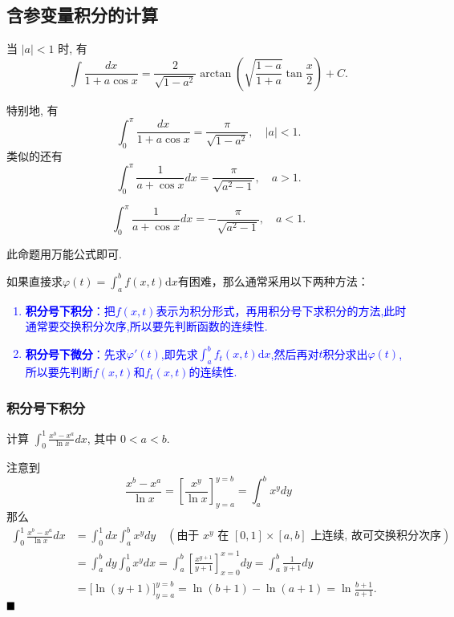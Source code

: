 \documentclass[lang=cn,newtx,10pt,scheme=chinese]{elegantbook}
\begin{document}
\subsection{含参变量积分的计算}
\begin{proposition}
当 $|a|<1$ 时, 有
\begin{equation*}
\int \frac{dx}{1+a\cos x} = \frac{2}{\sqrt{1-a^2}} \arctan\left(\sqrt{\frac{1-a}{1+a}}\tan\frac{x}{2}\right) + C. 
\end{equation*}

特别地, 有
\begin{equation*}
\int_{0}^{\pi} \frac{dx}{1+a\cos x} = \frac{\pi}{\sqrt{1-a^2}}, \quad |a|<1. 
\end{equation*}
类似的还有
$$
\int_{0}^{\pi} \frac{1}{a + \cos x} dx = \frac{\pi}{\sqrt{a^2 - 1}}, \quad a > 1.
$$

$$
\int_{0}^{\pi} \frac{1}{a + \cos x} dx =  - \frac{\pi}{\sqrt{a^2 - 1}}, \quad a < 1.
$$
\end{proposition}
\begin{remark}
    此命题用万能公式即可.
\end{remark}

如果直接求$\varphi(t) = \int_{a}^{b}f(x,t) \mathrm d x$有困难，那么通常采用以下两种方法：
\textcolor{blue}{\begin{enumerate}
    \item \textbf{积分号下积分}：把$f(x,t)$表示为积分形式，再用积分号下求积分的方法,此时通常要交换积分次序,所以要先判断函数的连续性.
    \item \textbf{积分号下微分}：先求$\varphi'(t)$,即先求$\int_{a}^{b}f_t(x,t) \mathrm d x$,然后再对$t$积分求出$\varphi(t)$,所以要先判断$f(x,t)$和$f_t(x,t)$的连续性.
\end{enumerate}}

\subsubsection{积分号下积分}

\begin{example}
计算 $\int_0^1 \frac{x^b - x^a}{\ln x} dx$, 其中 $0 < a < b$.
\end{example}

\begin{solution}
注意到 $$\frac{x^b - x^a}{\ln x} = \left[ \frac{x^y}{\ln x} \right]_{y=a}^{y=b} = \int_a^b x^y dy$$
那么
\begin{align*}
\int_0^1 \frac{x^b - x^a}{\ln x} dx &= \int_0^1 dx \int_a^b x^y dy \quad (\text{由于 } x^y \text{ 在 } [0,1] \times [a,b] \text{ 上连续, 故可交换积分次序}) \\
&= \int_a^b dy \int_0^1 x^y dx = \int_a^b \left[ \frac{x^{y+1}}{y+1} \right]_{x=0}^{x=1} dy = \int_a^b \frac{1}{y+1} dy \\
&= \big[ \ln(y+1) \big]_{y=a}^{y=b} = \ln(b+1) - \ln(a+1) = \ln\frac{b+1}{a+1}. 
\end{align*}
$ \hfill \blacksquare$
\end{solution}
\end{document}
